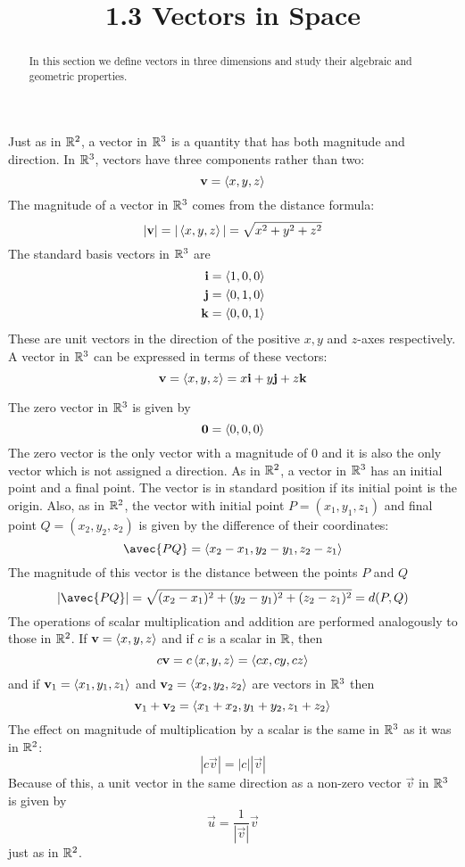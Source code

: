 \documentclass[handout]{ximera}
\title{1.3 Vectors in Space}
\begin{document}
\begin{abstract}
In this section we define vectors in three dimensions and study their algebraic and geometric properties.
\end{abstract}
 
\maketitle

Just as in $\mathbb R^2$, a vector in $\mathbb R^3$ is a quantity that has both magnitude and direction.
In $\mathbb R^3$, vectors have three components rather than two:
\[
\mathbf{v} = \left\langle x, y, z\right\rangle
\]
The magnitude of a vector in $\mathbb R^3$ comes from the distance formula:
\[
|\mathbf{v}| = |\left\langle x, y, z\right\rangle| = \sqrt{x^2 + y^2 + z^2}
\]
The standard basis vectors in $\mathbb R^3$ are
\begin{align*}
\mathbf{i} &= \left\langle 1, 0, 0\right\rangle\\
\mathbf{j} &= \left\langle 0, 1, 0\right\rangle\\
\mathbf{k} &= \left\langle 0, 0, 1\right\rangle\\
\end{align*}
These are unit vectors in the direction of the positive $x, y$ and $z$-axes respectively.
A vector in $\mathbb R^3$ can be expressed in terms of these vectors:
\[
\mathbf{v} = \left\langle x, y, z\right\rangle = x\mathbf{i} + y\mathbf{j} + z\mathbf{k}
\]

The zero vector in $\mathbb R^3$ is given by
\[
\mathbf{0} = \left\langle 0,0,0\right\rangle
\]
The zero vector is the only vector with a magnitude of $0$ and it is also the only vector which is not assigned a direction.
As in $\mathbb R^2$, a vector in $\mathbb R^3$ has an initial point and a final point.  The vector is in standard position if its initial point is the origin.
Also, as in $\mathbb R^2$, the vector with initial point $P = (x_1, y_1, z_1)$ and final point $Q = (x_2, y_2, z_2)$ is given by the difference of their coordinates:
\[
\avec{PQ} = \vector{x_2 - x_1, y_2-y_1, z_2-z_1}
\]
The magnitude of this vector is the distance between the points $P$ and $Q$
\[
|\avec{PQ}| = \sqrt{(x_2-x_1)^2 + (y_2-y_1)^2 +(z_2-z_1)^2} = d(P, Q)
\]
The operations of scalar multiplication and addition are performed analogously to those in $\mathbb R^2$.
If $\mathbf{v} = \left\langle x, y, z\right\rangle$ and if $c$ is a scalar in $\mathbb R$, then
\[
c\mathbf{v} = c\left\langle x, y, z\right\rangle = \left\langle cx, cy, cz\right\rangle
\]
and if $\mathbf{v}_1 = \left\langle x_1, y_1, z_1\right\rangle$ and $\mathbf{v}_2 = \left\langle x_2, y_2, z_2\right\rangle$ are vectors in $\mathbb R^3$ then
\[
\mathbf{v}_1 + \mathbf{v}_2 = \left\langle x_1+x_2, y_1+y_2, z_1+z_2\right\rangle
\]
The effect on magnitude of multiplication by a scalar is the same in $\mathbb R^3$ as it was in $\mathbb R^2$:
\[
|c\vec{v}| = |c| |\vec{v}|
\]
Because of this, a unit vector in the same direction as a non-zero vector $\vec{v}$ in $\mathbb R^3$ is given by
\[
\vec{u} = \frac{1}{|\vec{v}|} \vec{v}
\]
just as in $\mathbb R^2$.
\end{document}
